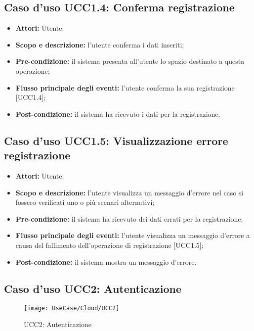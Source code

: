 \subsection{Caso d'uso UCC1.4: Conferma registrazione}

\begin{itemize}
\item \textbf{Attori:} Utente;
\item \textbf{Scopo e descrizione:} l'utente conferma i dati inseriti;
\item \textbf{Pre-condizione:} il sistema presenta all'utente lo spazio destinato a questa operazione;
\item \textbf{Flusso principale degli eventi:} l'utente conferma la sua registrazione [UCC1.4];
\item \textbf{Post-condizione:} il sistema ha ricevuto i dati per la registrazione.
\end{itemize}

\subsection{Caso d'uso UCC1.5: Visualizzazione errore registrazione}

\begin{itemize}
\item \textbf{Attori:} Utente;
\item \textbf{Scopo e descrizione:} l'utente visualizza un messaggio d'errore nel caso si fossero verificati uno o più scenari alternativi;
\item \textbf{Pre-condizione:} il sistema ha ricevuto dei dati errati per la registrazione;
\item \textbf{Flusso principale degli eventi:} l'utente visualizza un messaggio d'errore a causa del fallimento dell'operazione di registrazione [UCC1.5];
\item \textbf{Post-condizione:} il sistema mostra un messaggio d'errore.
\end{itemize}

\subsection{Caso d'uso UCC2: Autenticazione}

\begin{figure}[H]
\centering
\texttt{[image: UseCase/Cloud/UCC2]}
\caption{UCC2: Autenticazione}
\end{figure}

